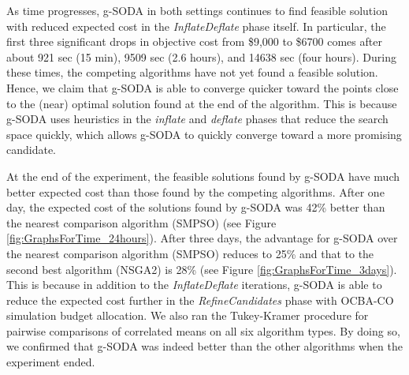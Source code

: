 \documentclass[a4paper, 12pt]{article} %
\begin{document}
As time progresses, g-SODA in both settings continues to find feasible solution with reduced expected cost in the \textit{InflateDeflate} phase itself. In particular, the first three significant drops in objective cost from \$9,000 to \$6700 comes after about 921 sec (15 min),  9509 sec (2.6 hours), and 14638 sec (four hours). During these times, the competing algorithms have not yet found a feasible solution.
Hence, we claim that g-SODA is able to converge quicker toward the points close to the (near) optimal solution found at the end of the algorithm. This is because g-SODA uses heuristics in the \textit{inflate} and \textit{deflate} phases that reduce the search space quickly, which allows g-SODA to quickly converge toward a more promising candidate. 

At the end of the experiment, the feasible solutions found by g-SODA  have much better expected cost than those found by the competing algorithms. After one day, the expected cost of the solutions found by g-SODA was 42\% better than the nearest comparison algorithm (SMPSO) (see Figure \ref{fig:GraphsForTime_24hours}). After three days, the advantage for g-SODA over the nearest comparison algorithm (SMPSO) reduces to 25\% and that to the second best algorithm (NSGA2) is 28\% (see Figure \ref{fig:GraphsForTime_3days}). This is because in addition to the \textit{InflateDeflate} iterations, g-SODA is able to reduce the expected cost further in the \textit{RefineCandidates} phase with OCBA-CO simulation budget allocation. 
We also ran the Tukey-Kramer procedure for pairwise comparisons of correlated means on all six algorithm types. By doing so, we confirmed that g-SODA was indeed better than the other algorithms when the experiment ended.
\end{document}

